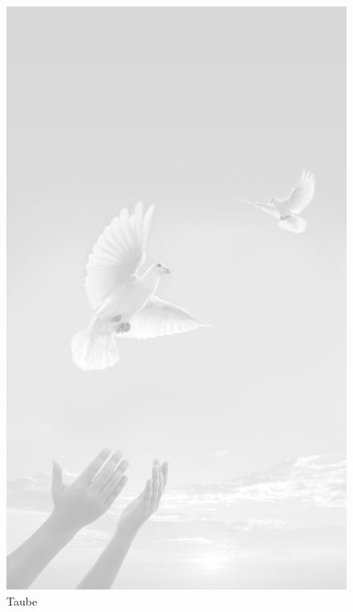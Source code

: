 \documentclass[ngerman,a4paper,11pt]{scrreprt}
\begin{document}
\begin{figure}[H]
\centering
\includegraphics[width=\textwidth,height=.8\textheight]{Bilder/Bilder/750_0010_18779_Todesanzeigen.jpg}
\caption{Taube}
\end{figure}
\end{document}
